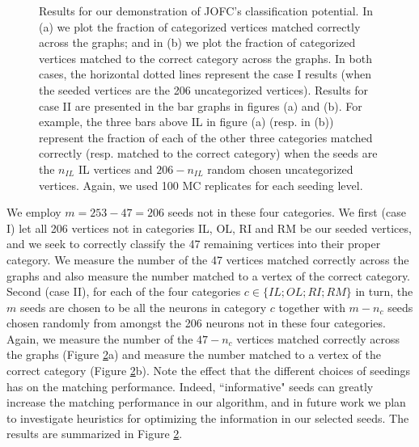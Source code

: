 \documentclass[12pt]{article}
\numberwithin{equation}{section}
\theoremstyle{definition}
\begin{document}
\begin{figure}[h]
\begin{subfigure}{.25\linewidth}
\caption{}
\label{fig:sub6}
\end{subfigure}
\caption{Results for our demonstration of JOFC's classification
    potential.  In (a) we plot the fraction of categorized vertices
    matched correctly across the graphs; and in (b) we plot the fraction
    of categorized vertices matched to the correct category across the
    graphs.  In both cases, the horizontal dotted lines represent the
    case I results (when the seeded vertices are the 206 uncategorized
    vertices). Results for case II are presented in the bar graphs
    in figures (a) and (b).  For example, the three bars above IL in
    figure (a) (resp. in (b)) represent the fraction of each of the
    other three categories matched correctly (resp. matched to the
    correct category) when the seeds are the $n_{IL}$ IL vertices and
    $206-n_{IL}$ random chosen uncategorized vertices.  Again, we used
    100 MC replicates for each seeding level.}
\label{fig:fig5}
\end{figure}


We employ $m=253-47=206$ seeds not in these four categories.  We first
(case I) let all 206 vertices not in categories IL, OL, RI and RM be our
seeded vertices, and we seek to correctly classify the 47 remaining
vertices into their proper category.  We measure the number of the 47
vertices matched correctly across the graphs and also measure the number
matched to a vertex of the correct category.  Second (case II), for each
of the four categories $c\in\{ IL;OL;RI;RM\}$ in turn, the $m$ seeds are
chosen to be all the neurons in category $c$ together with $m-n_c$ seeds
chosen randomly from amongst the 206 neurons not in these four
categories.  Again, we measure the number of the $47-n_c$ vertices
matched correctly across the graphs (Figure \ref{fig:fig5}a) and
measure the number matched to a vertex of the correct category (Figure
\ref{fig:fig5}b).  Note the effect that the different choices of
seedings has on the matching performance.  Indeed, ``informative" seeds
can greatly increase the matching performance in our algorithm, and in
future work we plan to investigate heuristics for optimizing the
information in our selected seeds.  The results are summarized in Figure
\ref{fig:fig5}.
\end{document}
